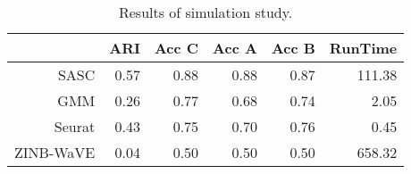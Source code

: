 \begin{table}[ht]
\centering
\begin{tabular}{rrrrrr}
  \hline
 & ARI & Acc C & Acc A & Acc B & RunTime \\ 
  \hline
SASC & 0.57 & 0.88 & 0.88 & 0.87 & 111.38 \\ 
  GMM & 0.26 & 0.77 & 0.68 & 0.74 & 2.05 \\ 
  Seurat & 0.43 & 0.75 & 0.70 & 0.76 & 0.45 \\ 
  ZINB-WaVE & 0.04 & 0.50 & 0.50 & 0.50 & 658.32 \\ 
   \hline
\end{tabular}
\caption{Results of simulation study.} 
\label{table:sim_results}
\end{table}
